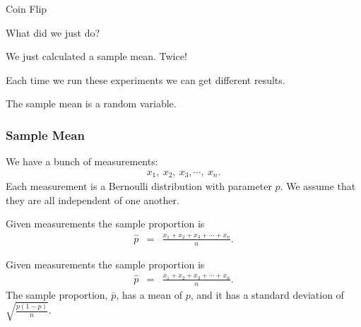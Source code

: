 \begin{frame}{Coin Flip}

What did we just do? 

  {
    We just calculated a sample mean. Twice!
  }

  {
    Each time we run these experiments we can get different results.

    The sample mean is a random variable.
  }
  
\end{frame}


\begin{frame}
  \frametitle{Sample Mean}

  We have a bunch of measurements:
  \begin{eqnarray*}
    x_1,~x_2,~x_3,\cdots,~x_n.
  \end{eqnarray*}
  Each measurement is a Bernoulli distribution with parameter $p$. We
  assume that they are all independent of one another.
  
  {
    \begin{definition}
      Given measurements the sample proportion is 
      \begin{eqnarray*}
        \hat{p} & = & \frac{x_1+x_2+x_3+\cdots+x_n}{n}.
      \end{eqnarray*}
    \end{definition}
  }

  {
    \begin{definition}
      Given measurements the sample proportion is 
      \begin{eqnarray*}
        \hat{p} & = & \frac{x_1+x_2+x_3+\cdots+x_n}{n}.
      \end{eqnarray*}
      The sample proportion, $\bar{p}$,  has a mean of $p$, and it has a
      standard deviation of $\sqrt{\frac{p(1-p)}{n}}$.
    \end{definition}
  }



\end{frame}


